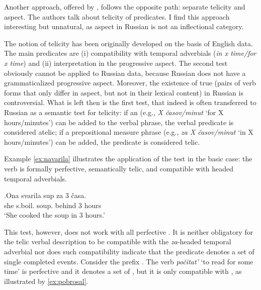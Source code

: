 Another approach, offered by \citet{PaduchevaPentus:08}, follows the opposite path: separate telicity and aspect. The authors talk about telicity of  predicates. I find this approach interesting but unnatural, as aspect in Russian is not an inflectional category. 

The notion of telicity has been originally developed on the basis of English data. The main  predicates are (i) compatibility with temporal adverbials (\textit{in x time/for x time}) and (ii) interpretation in the progressive aspect. The second test obviously cannot be applied to Russian data, because Russian does not have a grammaticalized progressive aspect. Moreover, the existence of true  (pairs of verb forms that only differ in aspect, but not in their lexical content) in Russian is controversial.
What is left then is the first test, that indeed is often transferred to Russian as a semantic test for telicity: if an  (e.g., \textit{X \v{c}asov/minut} `for X hours/minutes') can be added to the verbal phrase, the verbal predicate is considered atelic; if a prepositional measure phrase (e.g., \textit{za X \v{c}asov/minut} `in X hours/minutes') can be added, the predicate is considered telic.

Example \ref{ex:navarila} illustrates the application of the test in the basic case: the verb is formally perfective, semantically telic, and compatible with headed temporal adverbials. 

\exg.\label{ex:navarila}Ona svarila\textsuperscript{\PF} sup za 3 \v{c}asa.\\
she s.boil. soup. behind 3 hours\\
\trans `She cooked the soup in 3 hours.'

This test, however, does not work with all perfective . It is neither obligatory for the telic verbal description to be compatible with the \textit{za}-headed temporal adverbial nor does such compatibility indicate that the predicate denotes a set of single completed events. Consider the prefix . The verb \textit{po\v{c}itat'}\textsuperscript{\PF} `to read for some time' is perfective and it denotes a set of , but it is only compatible with , as illustrated by \ref{ex:pobrosal}.

